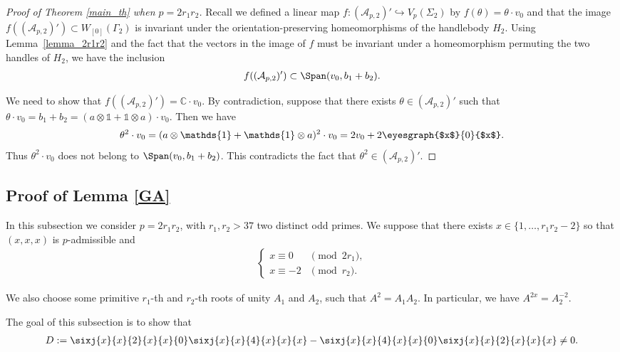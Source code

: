 \begin{proof}[Proof of Theorem \ref{main_th} when $p=2r_1r_2$]
Recall we defined a linear map $f\colon (\mathcal{A}_{p,2})' \hookrightarrow V_p(\Sigma_2)$ by $f(\theta)=\theta\cdot v_0$ and that the image $f\left( (\mathcal{A}_{p,2})' \right) \subset W_{[0]}(\Gamma_2)$ is invariant under the orientation-preserving homeomorphisms of the handlebody $H_2$. Using Lemma~\ref{lemma_2r1r2} and the fact that the vectors in the image of $f$ must be invariant under a homeomorphism permuting the two handles of $H_2$, we have the inclusion
\begin{gather*} f ( (\mathcal{A}_{p,2})' ) \subset \Span ( v_0, b_1+b_2 ).\end{gather*}

We need to show that $f( (\mathcal{A}_{p,2})' )= \mathbb{C}\cdot v_0$. By contradiction, suppose that there exists $\theta \in (\mathcal{A}_{p,2})'$ such that $\theta \cdot v_0 = b_1+b_2= (a\otimes \mathds{1} + \mathds{1}\otimes a) \cdot v_0$. Then we have
\begin{gather*}
\theta ^2 \cdot v_0 =( a \otimes \mathds{1} + \mathds{1}\otimes a )^2\cdot v_0= 2 v_0 + 2\eyesgraph{$x$}{0}{$x$}.
\end{gather*}
Thus $\theta^2\cdot v_0$ does not belong to $ \Span ( v_0, b_1+b_2 ) $. This contradicts the fact that $\theta^2 \in (\mathcal{A}_{p,2})'$.
\end{proof}

\subsection{Proof of Lemma \ref{GA}}

In this subsection we consider $p=2r_1r_2$, with $r_1, r_2>37$ two distinct odd primes. We suppose that there exists $x\in\{1,\ldots, r_1r_2-2\}$ so that $(x,x,x)$ is $p$-admissible and
\begin{gather*}\begin{cases}
x\equiv 0 & \pmod{2r_1}, \\
x\equiv -2 & \pmod{r_2}.
\end{cases}
\end{gather*}

We also choose some primitive $r_1$-{th} and $r_2$-{th} roots of unity $A_1$ and $A_2$, such that $A^2=A_1A_2$. In particular, we have $A^{2x}=A_2^{-2}$.

The goal of this subsection is to show that
\begin{gather*} D:= \sixj{x}{x}{2}{x}{x}{0}\sixj{x}{x}{4}{x}{x}{x} - \sixj{x}{x}{4}{x}{x}{0}\sixj{x}{x}{2}{x}{x}{x} \neq 0.\end{gather*}

